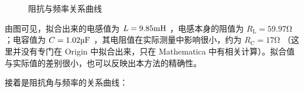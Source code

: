 \documentclass[a4paper,utf8]{article}
\begin{document}
        \begin{figure}[!ht]
            \\
            \\
            \caption{阻抗与频率关系曲线\label{fig:1}}
        \end{figure}\par
        \newpage
        由图可见，拟合出来的电感值为 $L=9.85\unit{\mH}$ ，电感本身的阻值为 $R_\text{L}=59.97\unit{\ohm}$；电容值为 $C=1.02\unit{\uF}$ ，其电阻值在实际测量中影响很小，约为 $R_\text{C}=17\unit{\ohm}$ （这里并没有专门在 Origin 中拟合出来，只在 Mathematica 中有相关计算）。拟合值与实际值的差别很小，也可以反映出本方法的精确性。\par
        接着是阻抗角与频率的关系曲线：\par
\end{document}
